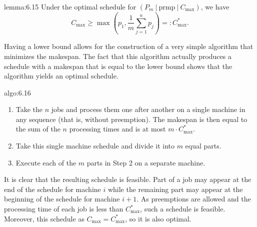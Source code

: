 \begin{lemma}{lemma:6.15}
    Under the optimal schedule for $(P_m~|~\text{prmp}~|~C_{\max})$, we have 
    \[ C_{\max} \geq \max\left( p_1, \frac1m \sum_{j=1}^n p_j \right) 
    =: C^*_{\max}. \] 
\end{lemma}

Having a lower bound allows for the construction of a very simple algorithm
that minimizes the makespan. The fact that this algorithm actually produces
a schedule with a makespan that is equal to the lower bound shows that the
algorithm yields an optimal schedule.

\begin{algo}{algo:6.16}
    \begin{enumerate}
        \item Take the $n$ jobs and process them one after another on a single 
        machine in any sequence (that is, without preemption). The makespan is 
        then equal to the sum of the $n$ processing times and is at most 
        $m \cdot C^*_{\max}$.
        
        \item Take this single machine schedule and divide it into $m$ equal parts.
        
        \item Execute each of the $m$ parts in Step 2 on a separate machine. 
    \end{enumerate}
\end{algo}

It is clear that the resulting schedule is feasible. Part of a job may appear
at the end of the schedule for machine $i$ while the remaining part may appear
at the beginning of the schedule for machine $i + 1$. As preemptions are allowed
and the processing time of each job is less than $C^*_{\max}$, such a schedule 
is feasible. Moreover, this schedule as $C_{\max} = C^*_{\max}$, so it is 
also optimal. 